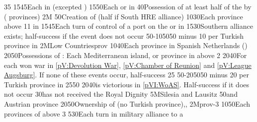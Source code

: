 {}{35}{\EUobjFranceContained}%
%
%
{15}{45}{Each \COL in  (excepted )}%
%
%
{15}{50}{Each \COL or \TP in }%
%
 
%
%
{}{40}{Possession of at least half of the \payshongrie by \AUSaus (
  provinces)}%
%
\EUobjective2M{}{}%
{}{50}{Creation of  (half if South HRE alliance)}%
%
%
{10}{30}{Each province above 11 in \paysmajeurAutriche}%
%
%
{15}{45}{Each turn of control of a port on the \seazoneBaltique or in
  \payshanse}%
%
%
{15}{30}{Southern \HRE alliance exists; half-success if the event does not
  occur}%
%
%
%
{50-10}{50}{50 \VPs minus 10 \VPs per Turkish province in \payshongrie}%
%
\EUobjective2M{Low Countries}{prov}%
{10}{40}{Each province in Spanish Netherlands (\regionBelgique)}%
%
%
{20}{50}{Possessions of : Each Mediterranean island, or province
  in  above 2}%
%
%
{20}{40}{For each won war in \ref{pV:Devolution War}, \ref{pV:Chamber of
    Reunion} and \ref{pV:League Augsburg}. If none of these events occur,
  half-success}%
%
%
{}{25}{}%
%
%
%
{50-20}{50}{50 \VPs minus 20 \VPs per Turkish province in \payshongrie}%
%
%
{25}{50}{\EUobjWoSS{\AUS}}%
%
%
{20}{40}{\AUS is victorious in \ref{pVI:WoAS}. Half-success if it does not
  occur}%
%
%
{}{30}{\paysmajeurPrusse has not received the Royal Dignity}%
%
\EUobjective5M{Silesia and Lausitz}{}%
{}{50}{\provinceSilesie and \provinceLausitz Austrian province}%
%
%
%
{20}{50}{Ownership of \payshongrie (no Turkish
  province),\provinceBosna,\provinceSerbia}%
%
\EUobjective2M{\paysnaples}{prov-3}%
{10}{50}{Each provinces of \paysnaples above 3}%
%
%
{5}{30}{Each turn in military alliance to a \MAJ}%
%
%
